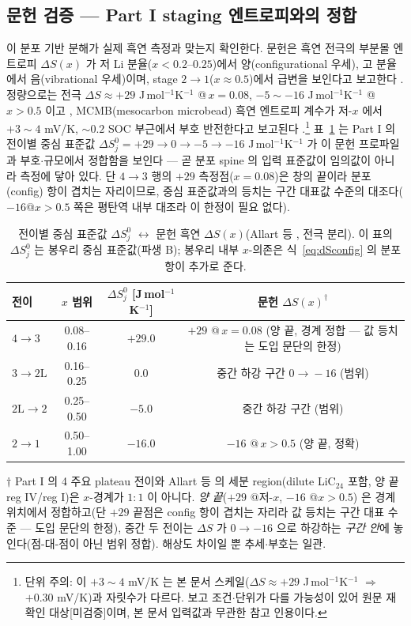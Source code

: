 \subsection{문헌 검증 --- Part I staging 엔트로피와의 정합}\label{ssec:litverif}
이 분포 기반 분해가 실제 흑연 측정과 맞는지 확인한다. 문헌은 흑연 전극의 부분몰 엔트로피 $\Delta S(x)$ 가
저 Li 분율($x<0.2$--$0.25$)에서 양(configurational 우세), 고 분율에서 음(vibrational 우세)이며, stage
$2\to1$($x\approx0.5$)에서 급변을 보인다고 보고한다 \cite{reynier2003,allart2018}. 정량으로는 전극
$\Delta S\approx+29$ J\,mol$^{-1}$K$^{-1}$ @\,$x=0.08$, $-5\sim-16$ J\,mol$^{-1}$K$^{-1}$ @\,$x>0.5$ 이고
\cite{allart2018}, MCMB(mesocarbon microbead) 흑연 엔트로피 계수가 저-$x$ 에서 $+3\sim4$ mV/K,
$\sim0.2$ SOC 부근에서 부호 반전한다고 보고된다 \cite{msmr_partII}.\footnote{단위 주의: 이 $+3\sim4$ mV/K 는
본 문서 스케일($\Delta S\approx+29$ J\,mol$^{-1}$K$^{-1}$ $\Rightarrow$ $+0.30$ mV/K)과 자릿수가 다르다. 보고
조건$\cdot$단위가 다를 가능성이 있어 원문 재확인 대상[미검증]이며, 본 문서 입력값과 무관한 참고 인용이다.}
표~\ref{tab:ds} 는 Part I 의 전이별 중심 표준값 $\Delta S^0_j=+29\to0\to-5\to-16$ J\,mol$^{-1}$K$^{-1}$ 가
이 문헌 프로파일과 부호$\cdot$규모에서 정합함을 보인다 --- 곧 분포 spine 의 입력 표준값이 임의값이 아니라
측정에 닿아 있다. 단 $4\!\to\!3$ 행의 $+29$ 측정점($x{=}0.08$)은 창의 끝이라 분포(config) 항이 겹치는
자리이므로, 중심 표준값과의 등치는 구간 대표값 수준의 대조다($-16$@$x>0.5$ 쪽은 평탄역 내부 대조라 이 한정이
필요 없다).

\begin{table}[t]
\centering\small
\renewcommand{\arraystretch}{1.2}
\caption{전이별 중심 표준값 $\Delta S^0_j$ $\leftrightarrow$ 문헌 흑연 $\Delta S(x)$(Allart 등
\cite{allart2018}, 전극 분리). 이 표의 $\Delta S^0_j$ 는 봉우리 중심 표준값(파생 B); 봉우리 내부 $x$-의존은
식~\eqref{eq:dSconfig} 의 분포 항이 추가로 준다.}
\label{tab:ds}
\begin{tabular}{l c c c}
\toprule
전이 & $x$ 범위 & $\Delta S^0_j$ [J\,mol$^{-1}$K$^{-1}$] & 문헌 $\Delta S(x)^\dagger$ \\
\midrule
$4\!\to\!3$ & 0.08–0.16 & $+29.0$ & $+29$ @\,$x{=}0.08$ (양 끝, 경계 정합 --- 값 등치는 도입 문단의 한정) \\
$3\!\to\!2\mathrm L$ & 0.16–0.25 & $0.0$ & 중간 하강 구간 $0\!\to\!-16$ (범위) \\
$2\mathrm L\!\to\!2$ & 0.25–0.50 & $-5.0$ & 중간 하강 구간 (범위) \\
$2\!\to\!1$ & 0.50–1.00 & $-16.0$ & $-16$ @\,$x{>}0.5$ (양 끝, 정확) \\
\bottomrule
\end{tabular}

\smallskip
{\footnotesize $\dagger$ Part I 의 4 주요 plateau 전이와 Allart 등 \cite{allart2018} 의 세분 region(dilute
LiC$_{24}$ 포함, 양 끝 reg IV/reg I)은 $x$-경계가 $1{:}1$ 이 아니다. \emph{양 끝}($+29$ @저-$x$, $-16$ @$x{>}0.5$)
은 경계 위치에서 정합하고(단 $+29$ 끝점은 config 항이 겹치는 자리라 값 등치는 구간 대표 수준 --- 도입
문단의 한정), 중간 두 전이는 $\Delta S$ 가 $0\to-16$ 으로 하강하는 \emph{구간 안}에 놓인다(점-대-점이 아닌
범위 정합). 해상도 차이일 뿐 추세$\cdot$부호는 일관.}
\end{table}

